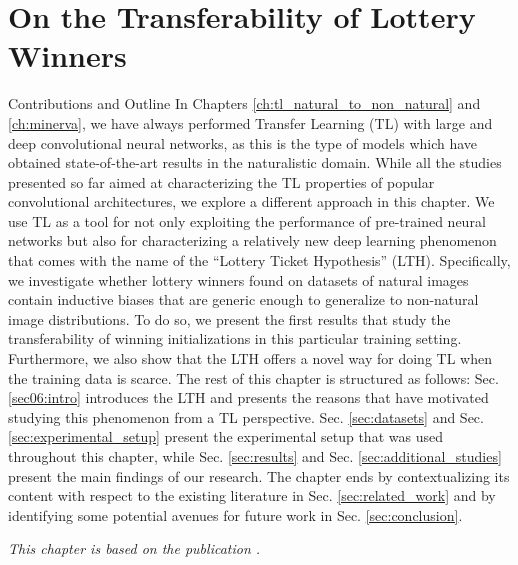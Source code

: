 
\chapter{On the Transferability of Lottery Winners} %
\label{ch:tl_lth} %

\begin{remark}{Contributions and Outline}
	In Chapters \ref{ch:tl_natural_to_non_natural} and \ref{ch:minerva}, we have always performed Transfer Learning (TL) with large and deep convolutional neural networks, as this is the type of models which have obtained state-of-the-art results in the naturalistic domain. While all the studies presented so far aimed at characterizing the TL properties of popular convolutional architectures, we explore a different approach in this chapter. We use TL as a tool for not only exploiting the performance of pre-trained neural networks but also for characterizing a relatively new deep learning phenomenon that comes with the name of the ``Lottery Ticket Hypothesis'' (LTH). Specifically, we investigate whether lottery winners found on datasets of natural images contain inductive biases that are generic enough to generalize to non-natural image distributions. To do so, we present the first results that study the transferability of winning initializations in this particular training setting. Furthermore, we also show that the LTH offers a novel way for doing TL when the training data is scarce. The rest of this chapter is structured as follows: Sec. \ref{sec06:intro} introduces the LTH and presents the reasons that have motivated studying this phenomenon from a TL perspective. Sec. \ref{sec:datasets} and Sec. \ref{sec:experimental_setup} present the experimental setup that was used throughout this chapter, while Sec. \ref{sec:results} and Sec. \ref{sec:additional_studies} present the main findings of our research. The chapter ends by contextualizing its content with respect to the existing literature in Sec. \ref{sec:related_work} and by identifying some potential avenues for future work in Sec. \ref{sec:conclusion}.

\vspace{5mm}
\textit{This chapter is based on the publication \citet{sabatelli2020transferability}.}

\end{remark}

